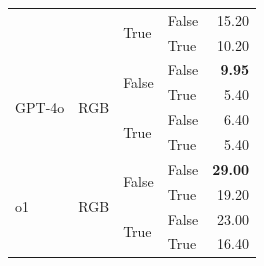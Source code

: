 \begin{tabular}{@{}llllr@{}}
                                                                        &                           & \multirow[c]{2}{*}{True}  & False                     & 15.20 \\
                                                                        &                           &                           & True                      & 10.20 \\
    \midrule                                
    \multirow[c]{4}{*}{GPT-4o}                                          & \multirow[c]{4}{*}{RGB}   & \multirow[c]{2}{*}{False} & False                     & \textbf{9.95} \\
                                                                        &                           &                           & True                      & 5.40 \\
                                                                        &                           & \multirow[c]{2}{*}{True}  & False                     & 6.40 \\
                                                                        &                           &                           & True                      & 5.40 \\
    \midrule                                
    \multirow[c]{4}{*}{o1}                                              & \multirow[c]{4}{*}{RGB}   & \multirow[c]{2}{*}{False} & False                     & \textbf{29.00} \\
                                                                        &                           &                           & True                      & 19.20 \\
                                                                        &                           & \multirow[c]{2}{*}{True}  & False                     & 23.00 \\
                                                                        &                           &                           & True                      & 16.40 \\
   \bottomrule
\end{tabular}
